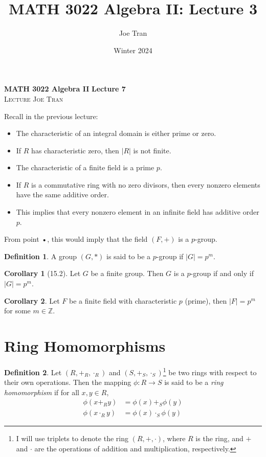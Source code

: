 \documentclass[11pt]{article}
\title{MATH 3022 Algebra II: Lecture 3}
\author{Joe Tran}
\date{Winter 2024}
\theoremstyle{definition}\newtheorem{definition}{Definition}
\theoremstyle{definition}\newtheorem*{notation}{Notation}
\theoremstyle{definition}\newtheorem{example}{Example}
\theoremstyle{theorem}\newtheorem{theorem}{Theorem}
\theoremstyle{theorem}\newtheorem{corollary}{Corollary}
\theoremstyle{theorem}\newtheorem{proposition}{Proposition}
\theoremstyle{theorem}\newtheorem{lemma}{Lemma}
\theoremstyle{theorem}\newtheorem{question}{Question}
\theoremstyle{remark}\newtheorem{remark}{Remark}
\newcommand{\Z}{\mathbb{Z}}
\begin{document}
\textbf{MATH 3022 Algebra II} \hfill \textbf{Lecture 7} \\
\textsc{Lecture} \hfill \textsc{Joe Tran}

Recall in the previous lecture:
\begin{itemize}
    \item[(1)] The characteristic of an integral domain is either prime or zero.
    \item[(2)] If $R$ has characteristic zero, then $|R|$ is not finite.
    \item[(1) + (2)] The characteristic of a finite field is a prime $p$.
    \item[(3)] If $R$ is a commutative ring with no zero divisors, then every nonzero elements have the same additive order. 
    \item This implies that every nonzero element in an infinite field has additive order $p$.
\end{itemize}

From point •, this would imply that the field $(F, +)$ is a $p$-group.

\begin{definition}
    A group $(G, *)$ is said to be a $p$-group if $|G| = p^m$.
\end{definition}

\begin{corollary}[15.2]
    Let $G$ be a finite group. Then $G$ is a $p$-group if and only if $|G| = p^m$.
\end{corollary}

\begin{corollary}
    Let $F$ be a finite field with characteristic $p$ (prime), then $|F| = p^m$ for some $m \in \Z$.
\end{corollary}

\section{Ring Homomorphisms}

\begin{definition}
    Let $(R, +_R, \cdot_R)$ and $(S, +_S, \cdot_S)$\footnote{I will use triplets to denote the ring $(R, +, \cdot)$, where $R$ is the ring, and $+$ and $\cdot$ are the operations of addition and multiplication, respectively.} be two rings with respect to their own operations. Then the mapping $\phi : R \to S$ is said to be a \emph{ring homomorphism} if for all $x, y \in R$,
    \begin{align*}
        \phi(x +_R y) &= \phi(x) +_S \phi(y) \\
        \phi(x \cdot_R y) &= \phi(x) \cdot_S \phi(y)
    \end{align*}
\end{definition}
\end{document}
